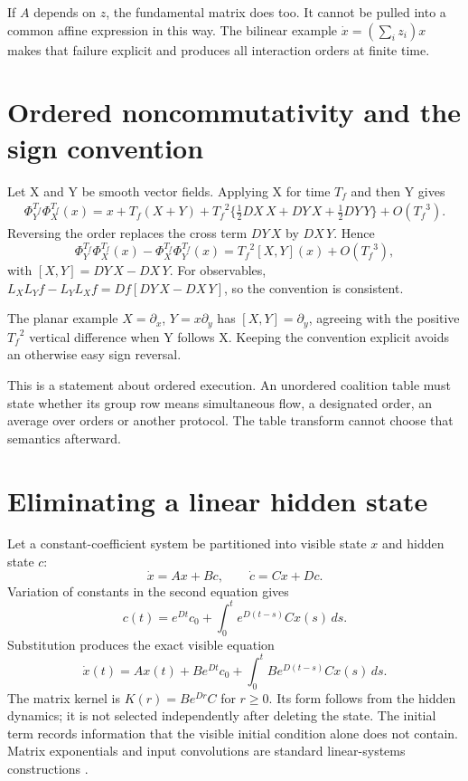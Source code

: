 If $A$ depends on $z$, the fundamental matrix does too. It cannot be pulled into a common affine expression in this way. The bilinear example $\dot x=(\sum_i z_i)x$ makes that failure explicit and produces all interaction orders at finite time.

\section{Ordered noncommutativity and the sign convention}
Let X and Y be smooth vector fields. Applying X for time ${T_f}$ and then Y gives
\begin{align}
 \Phi_Y^{T_f}\Phi_X^{T_f}(x)
 =x+{T_f}(X+Y)
 +{T_f}^2\{\tfrac12DX\,X+DY\,X+\tfrac12DY\,Y\}
 +O({T_f}^3).
\end{align}
Reversing the order replaces the cross term $DY\,X$ by $DX\,Y$. Hence
\begin{equation}
 \Phi_Y^{T_f}\Phi_X^{T_f}(x)-\Phi_X^{T_f}\Phi_Y^{T_f}(x)
 ={T_f}^2[X,Y](x)+O({T_f}^3),
\end{equation}
with $[X,Y]=DY\,X-DX\,Y$. For observables,
$L_XL_Yf-L_YL_Xf=Df[DY\,X-DX\,Y]$, so the convention is consistent.

The planar example $X=\partial_x$, $Y=x\partial_y$ has $[X,Y]=\partial_y$, agreeing with the positive ${T_f}^2$ vertical difference when Y follows X. Keeping the convention explicit avoids an otherwise easy sign reversal.

This is a statement about ordered execution. An unordered coalition table must state whether its group row means simultaneous flow, a designated order, an average over orders or another protocol. The table transform cannot choose that semantics afterward.

\section{Eliminating a linear hidden state}
Let a constant-coefficient system be partitioned into visible state $x$ and hidden state $c$:
\begin{equation}
 \dot x=Ax+Bc,\qquad \dot c=Cx+Dc.
\end{equation}
Variation of constants in the second equation gives
\begin{equation}
 c(t)=e^{Dt}c_0+\int_0^t e^{D(t-s)}Cx(s)\,ds.
\end{equation}
Substitution produces the exact visible equation
\begin{equation}\label{eq:general-memory}
 \dot x(t)=Ax(t)+Be^{Dt}c_0+
 \int_0^t Be^{D(t-s)}Cx(s)\,ds.
\end{equation}
The matrix kernel is $K(r)=Be^{Dr}C$ for $r\geq0$. Its form follows from the hidden dynamics; it is not selected independently after deleting the state. The initial term records information that the visible initial condition alone does not contain. Matrix exponentials and input convolutions are standard linear-systems constructions \cite{sontag,feedback-systems}.

